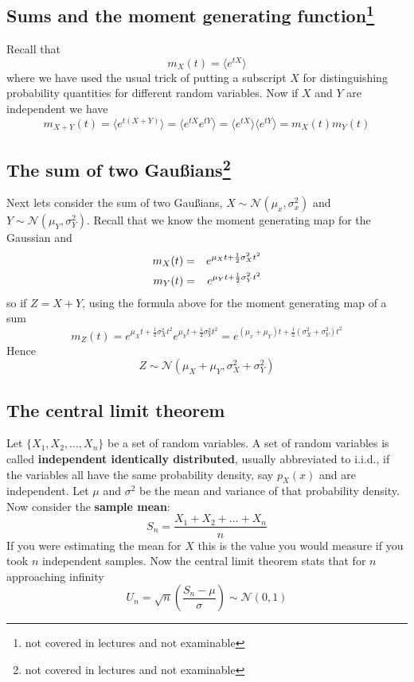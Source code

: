 \documentclass[11pt,a4paper]{scrartcl}
\begin{document}
\subsection*{Sums and the moment generating function\footnote{not covered in lectures and not examinable}}
Recall that
\begin{equation}
m_X(t)=\langle e^{tX}\rangle
\end{equation}
where we have used the usual trick of putting a subscript $X$ for
distinguishing probability quantities for different random variables. Now if $X$ and $Y$ are independent we have
\begin{equation}
m_{X+Y}(t)=\langle e^{t(X+Y)}\rangle=\langle e^{tX}e^{tY}\rangle=\langle e^{tX}\rangle \langle e^{tY}\rangle=m_X(t)m_Y(t)
\end{equation}

\subsection*{The sum of two Gau\ss{}ians\footnote{not covered in lectures and not examinable}}

Next lets consider the sum of two Gau\ss{}ians, $X\sim
\mathcal{N}(\mu_x,\sigma_x^2)$ and $Y\sim
\mathcal{N}(\mu_Y,\sigma_Y^2)$. Recall that we know the moment generating map for the Gaussian and
\begin{eqnarray}
m_X(t)&=&e^{\mu_X t+\frac{1}{2}\sigma_X^2t^2}\cr
m_Y(t)&=&e^{\mu_Y t+\frac{1}{2}\sigma_Y^2t^2}
\end{eqnarray}
so if $Z=X+Y$, using the formula above for the moment generating map
of a sum
\begin{equation}
m_Z(t)=e^{\mu_X t+\frac{1}{2}\sigma_X^2t^2}e^{\mu_Y t+\frac{1}{2}\sigma_Y^2t^2}
=e^{(\mu_x+\mu_Y)t+\frac{1}{2}(\sigma_X^2+\sigma_Y^2)t^2}
\end{equation}
Hence
\begin{equation}
Z\sim \mathcal{N}(\mu_X+\mu_Y,\sigma_X^2+\sigma_Y^2)
\end{equation}

\subsection*{The central limit theorem}

Let $\{X_1,X_2,\ldots,X_n\}$ be a set of random variables. A set of
random variables is called \textbf{independent identically distributed},
usually abbreviated to i.i.d., if the variables all have the same
probability density, say $p_X(x)$ and are independent. Let $\mu$ and
$\sigma^2$ be the mean and variance of that probability density. Now
consider the \textbf{sample mean}:
\begin{equation}
S_n=\frac{X_1+X_2+\ldots+X_n}{n}
\end{equation}
If you were estimating the mean for $X$ this is the value you would
measure if you took $n$ independent samples. Now the central limit
theorem stats that for $n$ approaching infinity
\begin{equation}
U_n=\sqrt{n}\left(\frac{S_n-\mu}{\sigma}\right) \sim \mathcal{N}(0,1)
\end{equation}
\end{document}
